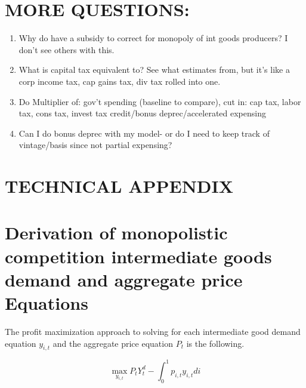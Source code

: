 \documentclass[article,11pt,letterpaper,fleqn]{article}
\theoremstyle{definition}
\numberwithin{equation}{section}
\newcommand{\cn}{\citeasnoun} %
\begin{document}
\section{MORE QUESTIONS:}
\begin{enumerate}
\item Why do \cn{CER2010} have a subsidy to correct for monopoly of int goods producers?  I don't see others with this.
\item What is capital tax equivalent to?  See what \cn{Zubairy2010} estimates from, but it's like a corp income tax, cap gains tax, div tax rolled into one.
\item Do Multiplier of: gov't spending (baseline to compare), cut in: cap tax, labor tax, cons tax, invest tax credit/bonus deprec/accelerated expensing
\item Can I do bonus deprec with my model- or do I need to keep track of vintage/basis since not partial expensing?
\end{enumerate}

\newpage





\newpage
\renewcommand{\theequation}{T.\arabic{section}.\arabic{equation}}
\renewcommand{\thesection}{T-\arabic{section}}   %
\setcounter{equation}{0}                         %
\setcounter{section}{0}                          %
\section*{TECHNICAL APPENDIX}                    %

\setcounter{equation}{0} %
\section{Derivation of monopolistic competition intermediate goods demand and aggregate price Equations}\label{TAppDemPrice}

The profit maximization approach to solving for each intermediate good demand equation $y_{i,t}$ and the aggregate price equation $P_t$ is the following.

\begin{equation}
\max_{y_{i,t}} P_{t}Y_{t}^{d} - \int_{0}^{1}p_{i,t}y_{i,t}di
\end{equation}
\end{document}
